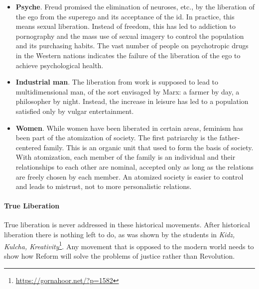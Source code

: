 \begin{itemize}
\item \textbf{Psyche}. Freud promised the elimination of neuroses, etc., by the liberation of the ego from the superego and its acceptance of the id. In practice, this means sexual liberation. Instead of freedom, this has led to addiction to pornography and the mass use of sexual imagery to control the population and its purchasing habits. The vast number of people on psychotropic drugs in the Western nations indicates the failure of the liberation of the ego to achieve psychological health.

\item \textbf{Industrial man}. The liberation from work is supposed to lead to multidimensional man, of the sort envisaged by Marx: a farmer by day, a philosopher by night. Instead, the increase in leisure has led to a population satisfied only by vulgar entertainment.

\item \textbf{Women}. While women have been liberated in certain areas, feminism has been part of the atomization of society. The first patriarchy is the father-centered family. This is an organic unit that used to form the basis of society. With atomization, each member of the family is an individual and their relationships to each other are nominal, accepted only as long as the relations are freely chosen by each member. An atomized society is easier to control and leads to mistrust, not to more personalistic relations.
\end{itemize}


\paragraph{True Liberation}


True liberation is never addressed in these historical movements. After historical liberation there is nothing left to do, as was shown by the students in \textit{Kidz, Kulcha, Kreativity}\footnote{\url{https://gornahoor.net/?p=1582}}. Any movement that is opposed to the modern world needs to show how Reform will solve the problems of justice rather than Revolution.



